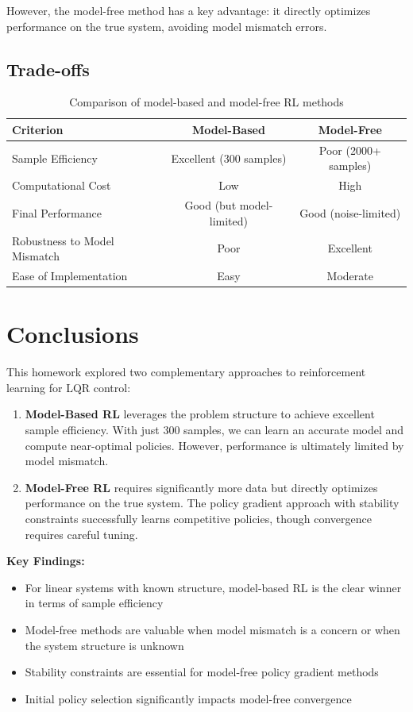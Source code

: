 \documentclass{report}
\begin{document}
However, the model-free method has a key advantage: it directly optimizes performance on the true system, avoiding model mismatch errors.

\subsection{Trade-offs}

\begin{table}[h]
\centering
\begin{tabular}{|l|c|c|}
\hline
\textbf{Criterion} & \textbf{Model-Based} & \textbf{Model-Free} \\
\hline
Sample Efficiency & Excellent (300 samples) & Poor (2000+ samples) \\
Computational Cost & Low & High \\
Final Performance & Good (but model-limited) & Good (noise-limited) \\
Robustness to Model Mismatch & Poor & Excellent \\
Ease of Implementation & Easy & Moderate \\
\hline
\end{tabular}
\caption{Comparison of model-based and model-free RL methods}
\end{table}

\section{Conclusions}

This homework explored two complementary approaches to reinforcement learning for LQR control:

\begin{enumerate}
    \item \textbf{Model-Based RL} leverages the problem structure to achieve excellent sample efficiency. With just 300 samples, we can learn an accurate model and compute near-optimal policies. However, performance is ultimately limited by model mismatch.

    \item \textbf{Model-Free RL} requires significantly more data but directly optimizes performance on the true system. The policy gradient approach with stability constraints successfully learns competitive policies, though convergence requires careful tuning.
\end{enumerate}

\textbf{Key Findings:}
\begin{itemize}
    \item For linear systems with known structure, model-based RL is the clear winner in terms of sample efficiency
    \item Model-free methods are valuable when model mismatch is a concern or when the system structure is unknown
    \item Stability constraints are essential for model-free policy gradient methods
    \item Initial policy selection significantly impacts model-free convergence
\end{itemize}
\end{document}
